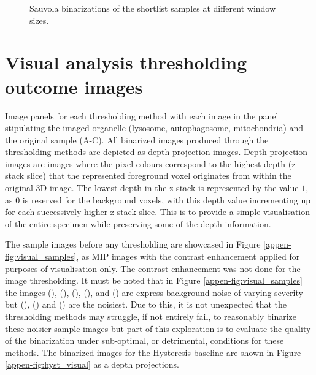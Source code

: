 \begin{figure}[hb!]
	\caption{Sauvola binarizations of the shortlist samples at different window sizes.}
	
\end{figure}


\chapter{Visual analysis thresholding outcome images}
\makeatletter{}\makeatother
\label{appen:visual_full_set}
Image panels for each thresholding method with each image in the panel stipulating the imaged organelle (lysosome, autophagosome, mitochondria) and the original sample (A-C). All binarized images produced through the thresholding methods are depicted as depth projection images. Depth projection images are images where the pixel colours correspond to the highest depth (z-stack slice) that the represented foreground voxel originates from within the original 3D image. The lowest depth in the z-stack is represented by the value $1$, as $0$ is reserved for the background voxels, with this depth value incrementing up for each successively higher z-stack slice. This is to provide a simple visualisation of the entire specimen while preserving some of the depth information.\par The sample images before any thresholding are showcased in Figure \ref{appen-fig:visual_samples}, as MIP images with the contrast enhancement applied for purposes of visualisation only. The contrast enhancement was not done for the image thresholding. It must be noted that in Figure \ref{appen-fig:visual_samples} the images (), (), (), (), and () are express background noise of varying severity but (), () and () are the noisiest. Due to this, it is not unexpected that the thresholding methods may struggle, if not entirely fail, to reasonably binarize these noisier sample images but part of this exploration is to evaluate the quality of the binarization under sub-optimal, or detrimental, conditions for these methods. The binarized images for the Hysteresis baseline are shown in Figure \ref{appen-fig:hyst_visual} as a depth projections.


